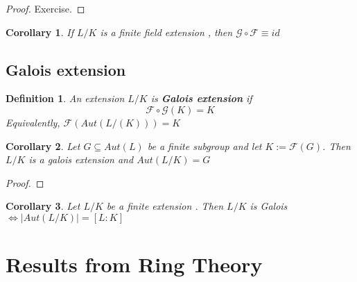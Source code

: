 \documentclass[10pt, oneside]{article}
\newcommand{\G}{\mathcal{G}}
\newcommand{\F}{\mathcal{F}}
\newtheorem{defn}{Definition}[section]
\newtheorem{cor}{Corollary}
\begin{document}
\begin{proof}
Exercise. 	
\end{proof}

\begin{cor}
	If $L/K$ is a finite field extension , then $\G\circ\F \equiv  id$
\end{cor}

\subsection{Galois extension}
\begin{defn}
	An extension $L/K$ is \textbf{Galois extension} if \[\F \circ\G (K) = K \]
Equivalently, \( \F(Aut(L/(K))) = K \)	
\end{defn}

\begin{cor}
Let $G \subseteq Aut(L)$ be a finite subgroup and let $K := \F(G)$. Then $L/K$ is a galois extension and $Aut(L/K) = G$
\end{cor}
\begin{proof}
	
\end{proof}

\begin{cor}
	Let $L/K$ be a finite extension . Then $L/K$ is Galois $\iff |Aut(L/K)| = [L:K]$
\end{cor}

\section{Results from Ring Theory}
\end{document}
